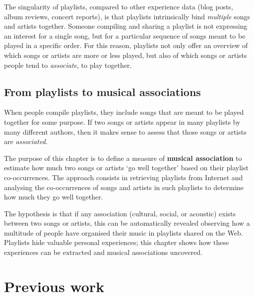 The singularity of playlists, compared to other experience data (blog posts, album reviews, concert reports), is that playlists intrinsically bind \emph{multiple} songs and artists together. Someone compiling and sharing a playlist is not expressing an interest for a single song, but for a particular sequence of songs meant to be played in a specific order.
%
For this reason, playlists not only offer an overview of which songs or artists are more or less played, but also of which songs or artists people tend to \emph{associate}, to play together. 



\subsection{From playlists to musical associations} %
\label{sub:from_playlists_to_musical_associations}

When people compile playlists, they include songs that are meant to be played together for some purpose. 
If two songs or artists appear in many playlists by many different authors, then it makes sense to assess that those songs or artists are \emph{associated}.

The purpose of this chapter is to define a measure of \textbf{musical association} to estimate how much two songs or artists `go well together' based on their playlist co-occurrences.
%
The approach consists in retrieving playlists from Internet and analysing the co-occurrences of songs and artists in such playlists to determine how much they go well together. %

The hypothesis is that if any association (cultural, social, or acoustic) exists between two songs or artists, this can be automatically revealed observing how a multitude of people have organised their music in playlists shared on the Web.
%
Playlists hide valuable personal experiences; this chapter shows how these experiences can be extracted and musical associations uncovered.




\section{Previous work} %
\label{sec:previous_works2}

